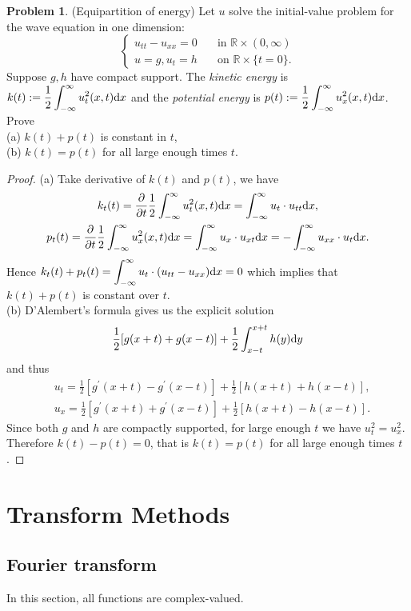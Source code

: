 \documentclass[hyperref,UTF8,12pt]{article}
\numberwithin{equation}{subsection}
\theoremstyle{plain}
\theoremstyle{definition}
\newtheorem{problem}{Problem}
\numberwithin{theorem}{section}
\numberwithin{lemma}{section}
\numberwithin{proposition}{section}
\numberwithin{remark}{section}
\numberwithin{corollary}{section}
\numberwithin{definition}{section}
\numberwithin{problem}{section}
\numberwithin{example}{section}
\def\dif{\textup{d}}
\newcommand{\dis}{\displaystyle}
\newcommand{\ptl}{\partial}
\newcommand{\mr}{\mathbb{R}}
\begin{document}
\begin{problem}
(Equipartition of energy) Let $u$ solve the initial-value problem for the wave equation in one dimension:
\[\begin{cases}u_{tt}-u_{xx}=0&\quad\text{in }\mr\times(0,\infty)\\
	u=g,u_t=h&\quad\text{on }\mr\times\{t=0\}.\end{cases}\]
Suppose $g,h$ have compact support. The \textit{kinetic energy} is $k(t):=\dis\frac{1}{2} \int_{-\infty}^{\infty}u_t^2(x,t)\dif x$ and the \textit{potential energy} is $p(t):=\dis\frac{1}{2}\int_{-\infty}^{\infty}u_x^2(x,t)\dif x$. Prove\\
(a) $k(t)+p(t)$ is constant in $t$,\\
(b) $k(t)=p(t)$ for all large enough times $t$.
\end{problem}
\begin{proof}
(a) Take derivative of $k(t)$ and $p(t)$, we have\[\begin{gathered}
	k_t(t)=\frac{\ptl}{\ptl t}\frac{1}{2} \int_{-\infty}^{\infty}u_t^2(x,t)\dif x=\int_{-\infty}^{\infty}u_t\cdot u_{tt}\dif x,\\
	p_t(t)=\frac{\ptl}{\ptl t}\frac{1}{2}\int_{-\infty}^{\infty}u_x^2(x,t)\dif x=\int_ {-\infty}^{\infty}u_x\cdot u_{xt}\dif x=-\int_{-\infty}^{\infty}u_{xx}\cdot u_t\dif x.
\end{gathered}\]
Hence $k_t(t)+p_t(t)=\dis\int_{-\infty}^{\infty}u_t\cdot(u_{tt}-u_{xx})\dif x=0$ which implies that $k(t)+p(t)$ is constant over $t$.\\
(b) D'Alembert's formula gives us the explicit solution \[\frac{1}{2}[g(x+t)+g(x-t)]+\frac{1}{2} \int_{x-t}^{x+t}h(y)\dif y\] and thus
\[\begin{aligned}
	&u_t=\frac{1}{2}[g^{\prime}(x+t)-g^{\prime}(x-t)]+\frac{1}{2}[h(x+t)+h(x-t)],\\
	&u_x=\frac{1}{2}[g^{\prime}(x+t)+g^{\prime}(x-t)]+\frac{1}{2}[h(x+t)-h(x-t)].
\end{aligned}\]
Since both $g$ and $h$ are compactly supported, for large enough $t$ we have $u_t^2=u_x^2$. Therefore $k(t)-p(t)=0$, that is $k(t)=p(t)$ for all large enough times $t$.
\end{proof}


\newpage
\section{Transform Methods}
\subsection{Fourier transform}
In this section, all functions are complex-valued.
\end{document}
